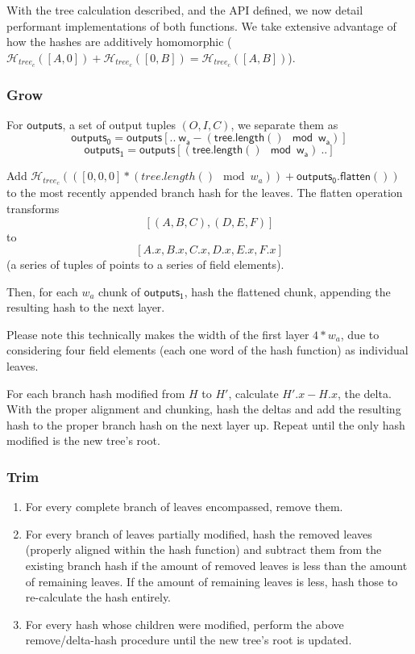\documentclass[]{article}
\begin{document}
With the tree calculation described, and the API defined, we now detail performant implementations of both functions. We take extensive advantage of how the hashes are additively homomorphic ($\mathcal{H}_{tree_c}([A, 0]) + \mathcal{H}_{tree_c}([0, B]) = \mathcal{H}_{tree_c}([A, B])$).

\subsubsection{Grow}

For $\mathsf{outputs}$, a set of output tuples $(O, I, C)$, we separate them as
$$
\mathsf{outputs_0} = \mathsf{outputs[.. ~w_a - (tree.length() \mod w_a)]}
$$
$$
\mathsf{outputs_1} = \mathsf{outputs[(tree.length() \mod w_a) ~..]}
$$

Add $\mathcal{H}_{tree_c}(([0, 0, 0] * (tree.length() \mod w_a)) + \mathsf{outputs_0.flatten()})$ to the most recently appended branch hash for the leaves. The flatten operation transforms $$[(A, B, C), (D, E, F)]$$ to $$[
A.x, B.x, C.x,
D.x, E.x, F.x
]$$
(a series of tuples of points to a series of field elements).

Then, for each $w_a$ chunk of $\mathsf{outputs_1}$, hash the flattened chunk, appending the resulting hash to the next layer.

Please note this technically makes the width of the first layer $4 * w_a$, due to considering four field elements (each one word of the hash function) as individual leaves.

For each branch hash modified from $H$ to $H'$, calculate $H'.x - H.x$, the delta. With the proper alignment and chunking, hash the deltas and add the resulting hash to the proper branch hash on the next layer up. Repeat until the only hash modified is the new tree's root.

\subsubsection{Trim}

\begin{enumerate}
  \item For every complete branch of leaves encompassed, remove them.
  \item For every branch of leaves partially modified, hash the removed leaves (properly aligned within the hash function) and subtract them from the existing branch hash if the amount of removed leaves is less than the amount of remaining leaves. If the amount of remaining leaves is less, hash those to re-calculate the hash entirely.
  \item For every hash whose children were modified, perform the above remove/delta-hash procedure until the new tree's root is updated.
\end{enumerate}
\end{document}
